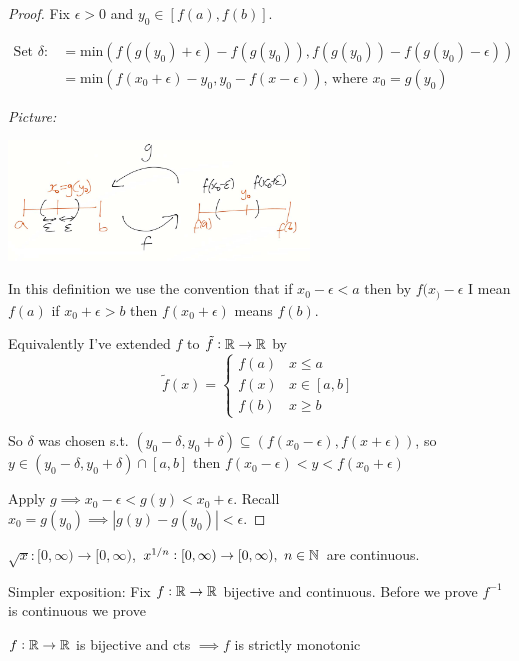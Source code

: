 \documentclass[10pt,twoside]{scrartcl}
\begin{document}
\begin{proof}
Fix $\epsilon >0$ and $y_0 \in [f(a),f(b)]$. 

\begin{align*}
\mbox{Set }\delta:&= \mathrm{min}(f(g(y_0) + \epsilon) - f(g(y_0)), f(g(y_0)) - f(g(y_0) - \epsilon))\\
	&= \mathrm{min}(f(x_0 + \epsilon) -  y_0, y_0 - f(x-\epsilon))\mbox{, where }x_0 = g(y_0)
\end{align*}

\emph{Picture:} 
\begin{center}
\includegraphics[width = 8cm]{ball2.jpg}
\end{center}

In this definition we use the convention that if $x_0 -\epsilon <a$ then by $f(x_) - \epsilon$ I mean $f(a)$ if $x_0 + \epsilon > b$ then $f(x_0 + \epsilon)$ means $f(b)$. 

Equivalently I've extended $f$ to $\tilde f: \mathbb{R} \to \mathbb{R}$ by \[\tilde f(x) =\begin{cases}
f(a) & x \leq a\\
f(x) & x \in [a,b]\\
f(b) & x \geq b
\end{cases}
\]

So $\delta$ was chosen s.t. $(y_0 -\delta, y_0 + \delta) \subseteq (f(x_0 - \epsilon), f(x+\epsilon))$, so $y \in (y_0 - \delta, y_0 + \delta) \cap [a,b]$ then $f(x_0 -\epsilon) < y < f(x_0 + \epsilon)$

Apply $g\implies x_0 -\epsilon < g(y) < x_0 + \epsilon$. Recall $x_0 = g(y_0) \implies |g(y) - g(y_0)| < \epsilon$.
\end{proof}

\begin{corollary}
$\sqrt{x}: [0,\infty) \to [0,\infty)$, $x^{1/n}: [0,\infty) \to [0,\infty),~n\in\mathbb{N}$ are continuous. 	
\end{corollary}

Simpler exposition: Fix $f: \mathbb{R} \to \mathbb{R}$ bijective and continuous. Before we prove $f^{-1}$ is continuous we prove

\begin{lemma}
$f:\mathbb{R} \to \mathbb{R}$ is bijective and cts $\implies f$ is strictly monotonic	
\end{lemma}
\end{document}
